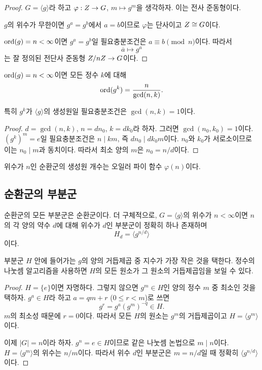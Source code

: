 \begin{proof}
$G=\langle g\rangle$라 하고 $\varphi:Z\to G$, $m\mapsto g^m$을 생각하자. 이는 전사 준동형이다.

$g$의 위수가 무한이면 $g^a=g^b$에서 $a=b$이므로 $\varphi$는 단사이고 $Z\cong G$이다.

$\operatorname{ord}(g)=n<\infty$이면 $g^a=g^b$일 필요충분조건은 $a\equiv b\pmod n$이다. 따라서
\[
  \overline a\longmapsto g^a
\]
는 잘 정의된 전단사 준동형 $Z/nZ\to G$이다.
\end{proof}

\begin{proposition}[거듭제곱의 위수]
$\operatorname{ord}(g)=n<\infty$이면 모든 정수 $k$에 대해
\[
  \operatorname{ord}(g^k)=\frac{n}{\gcd(n,k)}.
\]

특히 $g^k$가 $\langle g\rangle$의 생성원일 필요충분조건은 $\gcd(n,k)=1$이다.
\end{proposition}

\begin{proof}
$d=\gcd(n,k)$, $n=dn_0$, $k=dk_0$라 하자. 그러면 $\gcd(n_0,k_0)=1$이다. $(g^k)^m=e$일 필요충분조건은 $n\mid km$, 즉 $dn_0\mid dk_0m$이다. $n_0$와 $k_0$가 서로소이므로 이는 $n_0\mid m$과 동치이다. 따라서 최소 양의 $m$은 $n_0=n/d$이다.
\end{proof}

\begin{corollary}
위수가 $n$인 순환군의 생성원 개수는 오일러 파이 함수 $\varphi(n)$이다.
\end{corollary}

\subsection{순환군의 부분군}

\begin{theorem}
순환군의 모든 부분군은 순환군이다. 더 구체적으로, $G=\langle g\rangle$의 위수가 $n<\infty$이면 $n$의 각 양의 약수 $d$에 대해 위수가 $d$인 부분군이 정확히 하나 존재하며
\[
  H_d=\langle g^{n/d}\rangle
\]
이다.
\end{theorem}

\begin{proofidea}
부분군 $H$ 안에 들어가는 $g$의 양의 거듭제곱 중 지수가 가장 작은 것을 택한다. 정수의 나눗셈 알고리즘을 사용하면 $H$의 모든 원소가 그 원소의 거듭제곱임을 보일 수 있다.
\end{proofidea}

\begin{proof}
$H=\{e\}$이면 자명하다. 그렇지 않으면 $g^m\in H$인 양의 정수 $m$ 중 최소인 것을 택하자. $g^a\in H$라 하고 $a=qm+r$ ($0\le r<m$)로 쓰면
\[
  g^r=g^a(g^m)^{-q}\in H.
\]
$m$의 최소성 때문에 $r=0$이다. 따라서 모든 $H$의 원소는 $g^m$의 거듭제곱이고 $H=\langle g^m\rangle$이다.

이제 $|G|=n$이라 하자. $g^n=e\in H$이므로 같은 나눗셈 논법으로 $m\mid n$이다. $H=\langle g^m\rangle$의 위수는 $n/m$이다. 따라서 위수 $d$인 부분군은 $m=n/d$일 때 정확히 $\langle g^{n/d}\rangle$이다.
\end{proof}

